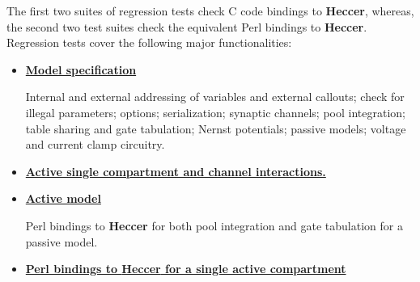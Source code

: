 \documentclass[12pt]{article}
\begin{document}
The first two suites of regression tests check C code bindings to {\bf Heccer}, whereas, the second two test suites check the equivalent Perl bindings to {\bf Heccer}. Regression tests cover the following major functionalities:
\begin{itemize}
\item[]\href{http://www.neurospaces.org/neurospaces_project/heccer/tests/html/specifications/main.html}{\bf Model specification}

Internal and external addressing of variables and external callouts; check for illegal parameters; options; serialization; synaptic channels; pool integration; table sharing and gate tabulation; Nernst potentials; passive models; voltage and current clamp circuitry.

\item[]\href{http://www.neurospaces.org/neurospaces_project/heccer/tests/html/specifications/active/main.html}{\bf Active single compartment and channel interactions.}

\item[]\href{http://www.neurospaces.org/neurospaces_project/heccer/tests/html/specifications/glue/swig/perl/main.html}{\bf Active model}

Perl bindings to {\bf Heccer} for both pool integration and gate tabulation for a passive model.

\item[]\href{http://www.neurospaces.org/neurospaces_project/heccer/tests/html/specifications/glue/swig/perl/active/main.html}{\bf Perl bindings to {\bf Heccer} for a single active compartment}
\end{itemize}
\end{document}
